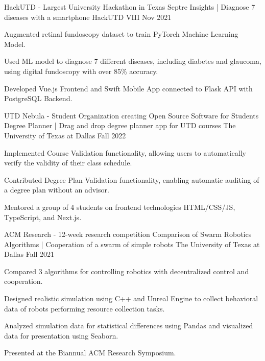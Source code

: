 
\begin{cventries}

\cventry
{HackUTD \color{lightgray} - Largest University Hackathon in Texas}
{Septre Insights \color{gray} | Diagnose 7 diseases with a smartphone}
{HackUTD VIII}
{Nov 2021}
{
\begin{cvitems}
\item {Augmented retinal fundoscopy dataset to train PyTorch Machine Learning
	Model.}
\item {Used ML model to diagnose 7 different diseases, including diabetes and
	glaucoma, using digital fundoscopy with over 85\% accuracy.}
\item {Developed Vue.js Frontend and Swift Mobile App connected to Flask API with PostgreSQL Backend.}
\end{cvitems}
}

\cventry
{UTD Nebula \color{lightgray} - Student Organization creating Open Source Software for Students}
{Degree Planner \color{gray} | Drag and drop degree planner app for UTD courses}
{The University of Texas at Dallas}
{Fall 2022}
{
\begin{cvitems}
\item {Implemented Course Validation functionality, allowing users to
	automatically verify the validity of their class schedule.}
\item {Contributed Degree Plan Validation functionality, enabling automatic auditing of a degree plan without an advisor.}
\item {Mentored a group of 4 students on frontend technologies HTML/CSS/JS,
	TypeScript, and Next.js.}
\end{cvitems}
}

\cventry
{ACM Research \color{lightgray} - 12-week research competition}
{Comparison of Swarm Robotics Algorithms \color{gray} | Cooperation of a swarm
	of simple robots}
{The University of Texas at Dallas}
{Fall 2021}
{
\begin{cvitems}
\item {Compared 3 algorithms for controlling robotics with decentralized control
	and cooperation.}
\item {Designed realistic simulation using C++ and Unreal Engine to collect
	behavioral data of robots performing resource collection tasks.}
\item {Analyzed simulation data for statistical differences using Pandas and
	visualized data for presentation using Seaborn.}
\item {Presented at the Biannual ACM Research Symposium.}
\end{cvitems}
}

\end{cventries}
